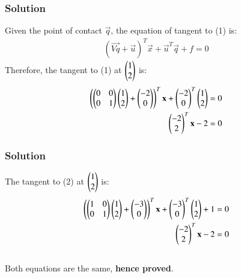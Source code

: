 \documentclass{beamer}
\begin{document}
\begin{frame}[fragile]
    \frametitle{Solution}
Given the point of contact $\vec{q}$, the equation of tangent to (1) is:
\begin{align}
    (\vec{Vq} + \vec{u})^T\vec{x} + \vec{u}^T\vec{q} + f = 0
\end{align}
Therefore, the tangent to (1) at $\begin{pmatrix}1\\2\end{pmatrix}$ is:
\begin{align}
    \left(\begin{pmatrix}0&0\\0&1\end{pmatrix}\begin{pmatrix}1\\2\end{pmatrix} + \begin{pmatrix}-2\\0\end{pmatrix}\right)^T\mathbf{x} + \begin{pmatrix}-2\\0\end{pmatrix}^T\begin{pmatrix}1\\2\end{pmatrix} = 0\\
    \begin{pmatrix}-2\\2\end{pmatrix}^T\mathbf{x} - 2 = 0
\end{align}
\end{frame}
\begin{frame}[fragile]
    \frametitle{Solution}
The tangent to (2) at $\begin{pmatrix}1\\2\end{pmatrix}$ is:
\begin{align}
    \left(\begin{pmatrix}1&0\\0&1\end{pmatrix}\begin{pmatrix}1\\2\end{pmatrix} + \begin{pmatrix}-3\\0\end{pmatrix}\right)^T\mathbf{x} + \begin{pmatrix}-3\\0\end{pmatrix}^T\begin{pmatrix}1\\2\end{pmatrix} + 1 =0\\
    \begin{pmatrix}-2\\2\end{pmatrix}^T\mathbf{x} - 2 = 0
\end{align}\\
Both equations are the same, \textbf{hence proved}.
\end{frame}
\end{document}

